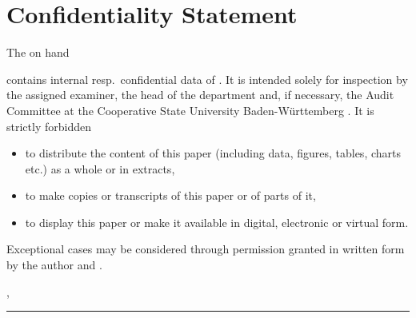 
\thispagestyle{empty}
\section*{Confidentiality Statement}

\vspace*{2em}


  The {\arbeit} on hand 
  \begin{center}{\itshape{} \titel{}\/}\end{center} 
   contains internal resp.\ confidential data of {\firma}. It is intended solely for inspection by the assigned examiner, the head of the {\studiengang} department and, if necessary, the Audit Committee at the Cooperative State University Baden-Württemberg {\dhbw}. It is strictly forbidden
    \begin{itemize}
    \item to distribute the content of this paper (including data, figures, tables, charts etc.) as a whole or in extracts,
    \item to make copies or transcripts of this paper or of parts of it,
    \item to display this paper or make it available in digital, electronic or virtual form.
    \end{itemize}
  Exceptional cases may be considered through permission granted in written form by the author and {\firma}.

\vspace{3em}

\abgabeort, \datumAbgabe
\vspace{4em}

\rule{6cm}{0.4pt}\\
\autor
